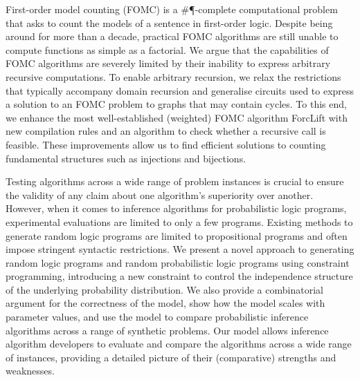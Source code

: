 First-order model counting (FOMC) is a \#\P-complete computational problem that asks to count the models of a sentence in first-order logic. Despite being around for more than a decade, practical FOMC algorithms are still unable to compute functions as simple as a factorial. We argue that the capabilities of FOMC algorithms are severely limited by their inability to express arbitrary recursive computations. To enable arbitrary recursion, we relax the restrictions that typically accompany domain recursion and generalise circuits used to express a solution to an FOMC problem to graphs that may contain cycles. To this end, we enhance the most well-established (weighted) FOMC algorithm ForcLift with new compilation rules and an algorithm to check whether a recursive call is feasible. These improvements allow us to find efficient solutions to counting fundamental structures such as injections and bijections.

\begin{displayquote}
\end{displayquote}

Testing algorithms across a wide range of problem instances is crucial to ensure the validity of any claim about one algorithm's superiority over another. However, when it comes to inference algorithms for probabilistic logic programs, experimental evaluations are limited to only a few programs. Existing methods to generate random logic programs are limited to propositional programs and often impose stringent syntactic restrictions. We present a novel approach to generating random logic programs and random probabilistic logic programs using constraint programming, introducing a new constraint to control the independence structure of the underlying probability distribution. We also provide a combinatorial argument for the correctness of the model, show how the model scales with parameter values, and use the model to compare probabilistic inference algorithms across a range of synthetic problems. Our model allows inference algorithm developers to evaluate and compare the algorithms across a wide range of instances, providing a detailed picture of their (comparative) strengths and weaknesses.


